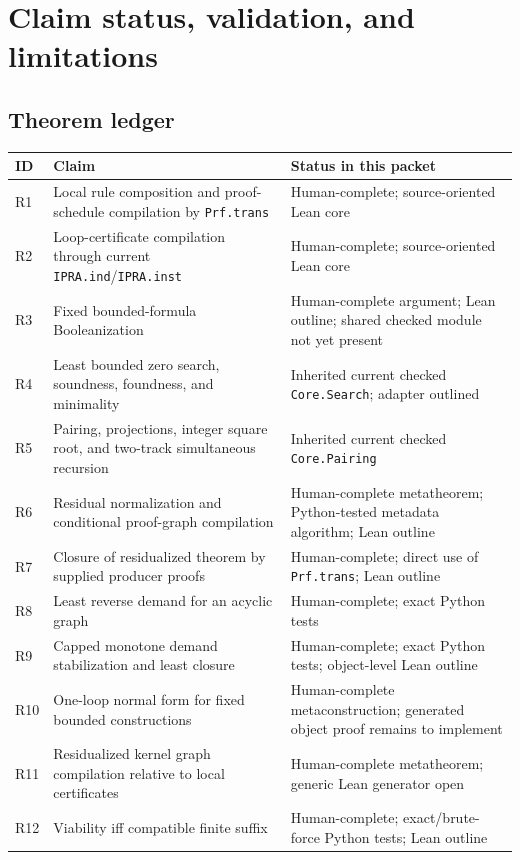 \section{Claim status, validation, and limitations}\label{sec:status}

\subsection{Theorem ledger}

\begin{longtable}{@{}p{}p{}p{}@{}}
\toprule
ID & Claim & Status in this packet \\
\midrule
\endhead
R1 & Local rule composition and proof-schedule compilation by \texttt{Prf.trans} & Human-complete; source-oriented Lean core \\
R2 & Loop-certificate compilation through current \texttt{IPRA.ind}/\texttt{IPRA.inst} & Human-complete; source-oriented Lean core \\
R3 & Fixed bounded-formula Booleanization & Human-complete argument; Lean outline; shared checked module not yet present \\
R4 & Least bounded zero search, soundness, foundness, and minimality & Inherited current checked \texttt{Core.Search}; adapter outlined \\
R5 & Pairing, projections, integer square root, and two-track simultaneous recursion & Inherited current checked \texttt{Core.Pairing} \\
R6 & Residual normalization and conditional proof-graph compilation & Human-complete metatheorem; Python-tested metadata algorithm; Lean outline \\
R7 & Closure of residualized theorem by supplied producer proofs & Human-complete; direct use of \texttt{Prf.trans}; Lean outline \\
R8 & Least reverse demand for an acyclic graph & Human-complete; exact Python tests \\
R9 & Capped monotone demand stabilization and least closure & Human-complete; exact Python tests; object-level Lean outline \\
R10 & One-loop normal form for fixed bounded constructions & Human-complete metaconstruction; generated object proof remains to implement \\
R11 & Residualized kernel graph compilation relative to local certificates & Human-complete metatheorem; generic Lean generator open \\
R12 & Viability iff compatible finite suffix & Human-complete; exact/brute-force Python tests; Lean outline \\

\end{longtable}
